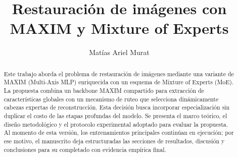 \documentclass[aps,prl,twocolumn,groupedaddress]{revtex4-2}
\begin{document}

\title{
Restauración de imágenes con MAXIM y Mixture of Experts
}


\author{Matías Ariel Murat}



\begin{abstract}
Este trabajo aborda el problema de restauración de imágenes mediante una variante de MAXIM (Multi-Axis MLP) enriquecida con un esquema de Mixture of Experts (MoE). La propuesta combina un backbone MAXIM compartido para extracción de características globales con un mecanismo de ruteo que selecciona dinámicamente cabezas expertas de reconstrucción. Esta decisión busca incorporar especialización sin duplicar el costo de las etapas profundas del modelo. Se presenta el marco teórico, el diseño metodológico y el protocolo experimental adoptado para evaluar la propuesta. Al momento de esta versión, los entrenamientos principales continúan en ejecución; por ese motivo, el manuscrito deja estructuradas las secciones de resultados, discusión y conclusiones para su completado con evidencia empírica final.
\end{abstract}
\end{document}
